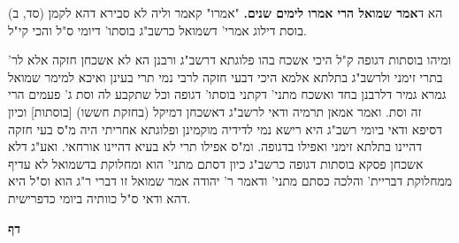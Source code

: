 \documentclass[12pt, openany]{book}
\newcommand{\sethebfont}{
\fontsize{10.5pt}{21.0pt} \selectfont
}
\newcommand{\twocol}[1]{
	{\sethebfont \begin{multicols}{2}
			#1
	\end{multicols}}	
}
\newcommand{\chapname}{}
\newcommand{\newchap}[1]{
	\addcontentsline{toc}{chapter}{#1}
	\renewcommand{\chapname}{#1}
		\begin{center}
			\textbf{%
\fontsize{16pt}{16pt}\selectfont
				#1}
		\end{center}
}
\begin{document}
\twocol{הא ד\textbf{אמר שמואל הרי אמרו לימים שנים.}  "אמרו" קאמר וליה לא סבירא דהא לקמן (סד, ב) בוסת דילוג אמרי' דשמואל כרשב"ג בוסתו' דיומי ס"ל והכי קי"ל.\par  ומיהו בוסתות דגופה ק"ל היכי אשכח בהו פלוגתא דרשב"ג ורבנן הא לא אשכחן חזקה אלא לר' בתרי זימני ולרשב"ג בתלתא אלמא היכי דבעי חזקה לרבי נמי תרי בעינן ואיכא למימר שמואל גמרא גמיר דלרבנן בחד ואשכח מתני' דקתני בוסתו' דגופה וכל שתקבע לה וסת ג' פעמים הרי זה וסת. ואמר אמאן תרמיה ודאי לרשב"ג דאשכחן דמיקל (בחזקת חששו) [בוסתות] וכיון דסיפא ודאי ביומי רשב"ג היא רישא נמי לדידיה מוקמינן ופלוגתא אחריתי היה מ"ס בעי חזקה דהיינו בתלתא זימני ואפילו בדגופה. ומ"ס אפילו תרי לא בעיא דהיינו אורחאי. ואע"ג דלא אשכחן פסקא בוסתות דגופה כרשב"ג כיון דסתם מתני' הוא ומחלוקת בדשמואל לא עדיף ממחלוקת דבריית' והלכה כסתם מתני' ודאמר ר' יהודה אמר שמואל זו דברי ר"ג הוא וס"ל היא דהא ודאי ס"ל כוותיה ביומי כדפרישית. 
\par}
\newchap{דף }
\end{document}
